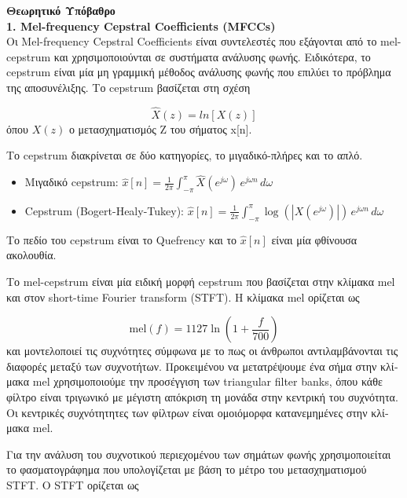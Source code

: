 \documentclass[a4paper,11pt]{article}
\begin{document}
\renewcommand{\figurename}{Σχήμα}
\renewcommand{\tablename}{Πίνακας}

\textbf{Θεωρητικό Υπόβαθρο}\\

\textbf{1. Mel-frequency Cepstral Coefficients (MFCCs)}\\

\textgreek{Οι }Mel-frequency Cepstral Coefficients \textgreek{είναι συντελεστές που εξάγονται από το }mel-cepstrum \textgreek{και χρησιμοποιούνται σε συστήματα ανάλυσης φωνής. Ειδικότερα, το }cepstrum \textgreek{είναι μία μη γραμμική μέθοδος ανάλυσης φωνής που επιλύει το πρόβλημα της αποσυνέλιξης. Το }cepstrum\textgreek{ βασίζεται στη σχέση }

\[ \hat X(z)=ln [X(z)] \]
\textgreek{όπου} $X(z)$ \textgreek{ο μετασχηματισμός }Z \textgreek{του σήματος} x[n]. 

\textgreek{Το }cepstrum \textgreek{διακρίνεται σε δύο κατηγορίες, το} μιγαδικό-πλήρες και το απλό.
\begin{itemize}
    \item {\textgreek{Μιγαδικό } cepstrum: $\hat{x}[n] = \frac{1}{2\pi} \int_{-\pi}^{\pi} \hat{X}(e^{j\omega}) \, e^{j\omega n} \, d\omega$}
    \item {Cepstrum (Bogert-Healy-Tukey): $\hat{x}[n] = \frac{1}{2\pi} \int_{-\pi}^{\pi} \log\left(\left|X(e^{j\omega})\right|\right)\, e^{j\omega n} \, d\omega$}
\end{itemize}

\textgreek{Το πεδίο του }cepstrum \textgreek{είναι το }Quefrency \textgreek{και το }$\hat x[n]$ \textgreek{είναι μία φθίνουσα ακολουθία.}

\textgreek{Το }mel-cepstrum \textgreek{είναι μία ειδική μορφή }cepstrum \textgreek{που βασίζεται στην κλίμακα }mel \textgreek{και στον }short-time Fourier transform (STFT). \textgreek{ Η κλίμακα }mel \textgreek{ορίζεται ως}

\[\mathrm{mel}(f) = 1127 \ln\left(1 + \frac{f}{700}\right)\]
\textgreek{και μοντελοποιεί τις συχνότητες σύμφωνα με το πως οι άνθρωποι αντιλαμβάνονται τις διαφορές μεταξύ των συχνοτήτων. Προκειμένου να μετατρέψουμε ένα σήμα στην κλίμακα }mel \textgreek{χρησιμοποιούμε την προσέγγιση των }triangular filter banks, \textgreek{όπου κάθε φίλτρο είναι τριγωνικό με μέγιστη απόκριση τη μονάδα στην κεντρική του συχνότητα. Οι κεντρικές συχνότητητες των φίλτρων είναι ομοιόμορφα κατανεμημένες στην κλίμακα }mel.

\textgreek{Για την ανάλυση του συχνοτικού περιεχομένου των σημάτων φωνής χρησιμοποιείται το φασματογράφημα που υπολογίζεται με βάση το μέτρο του μετασχηματισμού }STFT. \textgreek{Ο} STFT \textgreek{ορίζεται ως}
\end{document}

